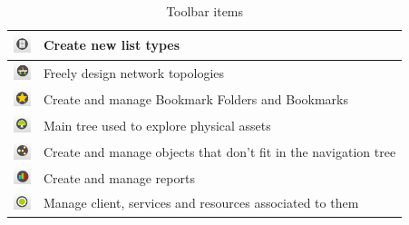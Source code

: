 \documentclass[a4paper]{article}
\begin{document}
\begin{table}[h!]
\begin{tabular}{cl}
			\midrule
			\includegraphics[width=0.5cm]{img/icon_list_type_manager.png} & Create new list types\\
			\midrule
			\includegraphics[width=0.5cm]{img/icon_topology_designer.png} & Freely design network topologies\\
			\midrule
			\includegraphics[width=0.5cm]{img/icon_bookmarks.png} & Create and manage Bookmark Folders and Bookmarks\\
			\midrule
			\includegraphics[width=0.5cm]{img/icon_navigation_tree.png} & Main tree used to explore physical assets\\
			\midrule
			\includegraphics[width=0.5cm]{img/icon_pools_manager.png} & Create and manage objects that don't fit in the navigation tree\\
			\midrule
			\includegraphics[width=0.5cm]{img/icon_reports.png} & Create and manage reports\\
			\midrule
			\includegraphics[width=0.5cm]{img/icon_service_manager.png} & Manage client, services and resources associated to them\\
		\end{tabular}	
		\caption{Toolbar items}
		\label{tab:toolbar_icons}
	\end{table}
	
	\newpage
\end{document}
